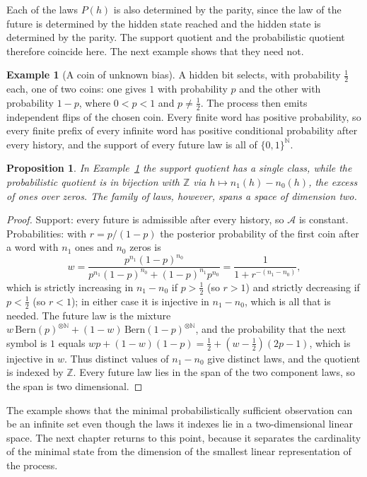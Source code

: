 \documentclass[11pt,oneside]{book}
\newtheorem{proposition}[theorem]{Proposition}
\theoremstyle{definition}
\newtheorem{example}[theorem]{Example}
\theoremstyle{remark}
\newcommand{\Adm}{\mathcal{A}}
\newcommand{\N}{\mathbb{N}}
\begin{document}
Each of the laws $P(h)$ is also determined by the parity, since the law of the future is determined by the hidden state reached and the hidden state is determined by the parity. The support quotient and the probabilistic quotient therefore coincide here. The next example shows that they need not.

\begin{example}[A coin of unknown bias]\label{ex:coin}
A hidden bit selects, with probability $\tfrac12$ each, one of two coins: one gives $1$ with probability $p$ and the other with probability $1-p$, where $0<p<1$ and $p\neq\tfrac12$. The process then emits independent flips of the chosen coin. Every finite word has positive probability, so every finite prefix of every infinite word has positive conditional probability after every history, and the support of every future law is all of $\{0,1\}^{\N}$.
\end{example}

\begin{proposition}\label{prop:coin}
In Example~\ref{ex:coin} the support quotient has a single class, while the probabilistic quotient is in bijection with $\mathbb Z$ via $h\mapsto n_1(h)-n_0(h)$, the excess of ones over zeros. The family of laws, however, spans a space of dimension two.
\end{proposition}

\begin{proof}
Support: every future is admissible after every history, so $\Adm$ is constant. Probabilities: with $r=p/(1-p)$ the posterior probability of the first coin after a word with $n_1$ ones and $n_0$ zeros is
\[
w=\frac{p^{n_1}(1-p)^{n_0}}{p^{n_1}(1-p)^{n_0}+(1-p)^{n_1}p^{n_0}}=\frac{1}{1+r^{-(n_1-n_0)}},
\]
which is strictly increasing in $n_1-n_0$ if $p>\tfrac12$ (so $r>1$) and strictly decreasing if $p<\tfrac12$ (so $r<1$); in either case it is injective in $n_1-n_0$, which is all that is needed. The future law is the mixture $w\,\mathrm{Bern}(p)^{\otimes\N}+(1-w)\,\mathrm{Bern}(1-p)^{\otimes\N}$, and the probability that the next symbol is $1$ equals $wp+(1-w)(1-p)=\tfrac12+(w-\tfrac12)(2p-1)$, which is injective in $w$. Thus distinct values of $n_1-n_0$ give distinct laws, and the quotient is indexed by $\mathbb Z$. Every future law lies in the span of the two component laws, so the span is two dimensional.
\end{proof}

The example shows that the minimal probabilistically sufficient observation can be an infinite set even though the laws it indexes lie in a two-dimensional linear space. The next chapter returns to this point, because it separates the cardinality of the minimal state from the dimension of the smallest linear representation of the process.
\end{document}
